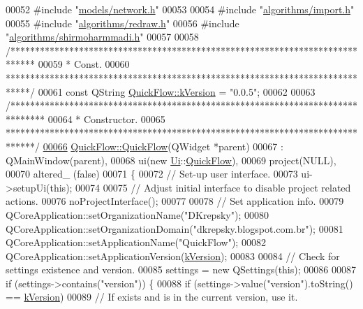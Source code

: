 \begin{DoxyCode}
00052 \textcolor{preprocessor}{#include "\hyperlink{network_8h}{models/network.h}"}
00053 
00054 \textcolor{preprocessor}{#include "\hyperlink{import_8h}{algorithms/import.h}"}
00055 \textcolor{preprocessor}{#include "\hyperlink{redraw_8h}{algorithms/redraw.h}"}
00056 \textcolor{preprocessor}{#include "\hyperlink{shirmoharmmadi_8h}{algorithms/shirmoharmmadi.h}"}
00057 
00058 \textcolor{comment}{/*****************************************************************************}
00059 \textcolor{comment}{* Const.}
00060 \textcolor{comment}{*****************************************************************************/}
00061 \textcolor{keyword}{const} QString \hyperlink{group___window_gabfc3b1280bdae9a9c046d56b1459ab99}{QuickFlow::kVersion} = \textcolor{stringliteral}{"0.0.5"};
00062 
00063 \textcolor{comment}{/*******************************************************************************}
00064 \textcolor{comment}{ * Constructor.}
00065 \textcolor{comment}{ ******************************************************************************/}
\hypertarget{quickflow_8cpp_source_l00066}{}\hyperlink{group___window_ga7689e2608835392fce3f4c95a7a542db}{00066} \hyperlink{group___window_ga7689e2608835392fce3f4c95a7a542db}{QuickFlow::QuickFlow}(QWidget *parent)
00067   : QMainWindow(parent),
00068     ui(new \hyperlink{namespace_ui}{Ui}::\hyperlink{class_quick_flow}{QuickFlow}),
00069     project(NULL),
00070     altered\_ (false)
00071 \{
00072   \textcolor{comment}{// Set-up user interface.}
00073   ui->setupUi(\textcolor{keyword}{this});
00074 
00075   \textcolor{comment}{// Adjust initial interface to disable project related actions.}
00076   noProjectInterface();
00077 
00078   \textcolor{comment}{// Set application info.}
00079   QCoreApplication::setOrganizationName(\textcolor{stringliteral}{"DKrepsky"});
00080   QCoreApplication::setOrganizationDomain(\textcolor{stringliteral}{"dkrepsky.blogspot.com.br"});
00081   QCoreApplication::setApplicationName(\textcolor{stringliteral}{"QuickFlow"});
00082   QCoreApplication::setApplicationVersion(\hyperlink{group___window_gabfc3b1280bdae9a9c046d56b1459ab99}{kVersion});
00083 
00084   \textcolor{comment}{// Check for settings existence and version.}
00085   settings = \textcolor{keyword}{new} QSettings(\textcolor{keyword}{this});
00086 
00087   \textcolor{keywordflow}{if} (settings->contains(\textcolor{stringliteral}{"version"})) \{
00088     \textcolor{keywordflow}{if} (settings->value(\textcolor{stringliteral}{"version"}).toString() == \hyperlink{group___window_gabfc3b1280bdae9a9c046d56b1459ab99}{kVersion})
00089       \textcolor{comment}{// If exists and is in the current version, use it.}

\end{DoxyCode}
